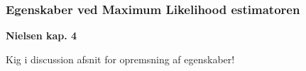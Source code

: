 \subsubsection{Egenskaber ved Maximum Likelihood estimatoren}

\textbf{Nielsen kap. 4}

Kig i discussion afsnit for opremsning af egenskaber!
